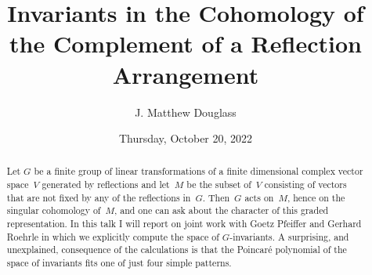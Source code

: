 \documentclass{UAmathtalk}
\author{J. Matthew Douglass}
\title{Invariants in the Cohomology of the Complement of a Reflection Arrangement}
\date{Thursday, October 20, 2022}
\begin{document}
\maketitle

\begin{abstract}
Let $G$ be a finite group of linear transformations of a finite dimensional complex vector space~$V$ generated by reflections and let~$M$ be the subset of~$V$ consisting of vectors that are not fixed by any of the reflections in~$G$. Then~$G$ acts on~$M$, hence on the singular cohomology of~$M$, and one can ask about the character of this graded representation. In this talk I will report on joint work with Goetz Pfeiffer and Gerhard Roehrle in which we explicitly compute the space of $G$-invariants. A surprising, and unexplained, consequence of the calculations is that the Poincaré polynomial of the space of invariants fits one of just four simple patterns.
\end{abstract}
\end{document}
